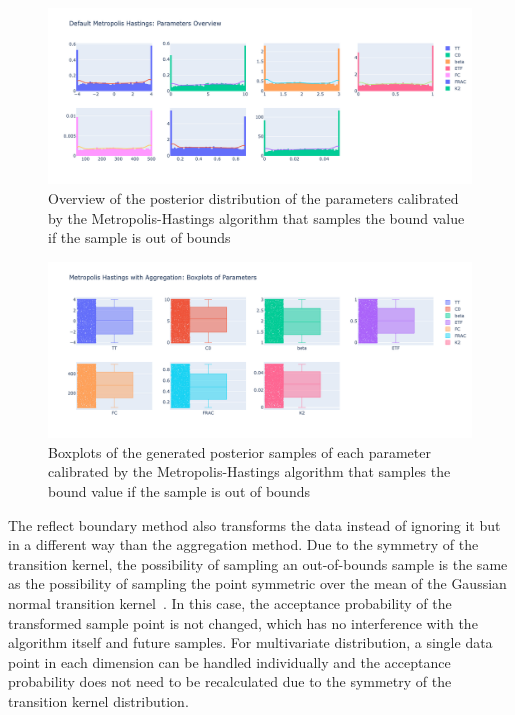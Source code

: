 \begin{figure}[H]
    \centering
    \includegraphics[width=1\textwidth]{figures/basic_mh/aggr_mh/aggr_mh_parameters_overview.png}
    \captionsetup{width=.8\textwidth}
    \caption{Overview of the posterior distribution of the parameters calibrated by the Metropolis-Hastings algorithm that samples the bound value if the sample is out of bounds}
    \label{fig:enter-label}
\end{figure}

\begin{figure}[H]
    \centering
    \includegraphics[width=1\textwidth]{figures/basic_mh/aggr_mh/aggr_mh_boxplot.png}
    \captionsetup{width=.8\textwidth}
    \caption{Boxplots of the generated posterior samples of each parameter
calibrated by the Metropolis-Hastings algorithm that samples the bound value if the sample is out of bounds}
    \label{fig:enter-label}
\end{figure}



The reflect boundary method also transforms the data instead of ignoring it but in a different way than the aggregation method. Due to the symmetry of the transition kernel, the possibility of sampling an out-of-bounds sample is the same as the possibility of sampling the point symmetric over the mean of the Gaussian normal transition kernel~\cite{gaussian_distribution_property}. In this case, the acceptance probability of the transformed sample point is not changed, which has no interference with the algorithm itself and future samples. For multivariate distribution, a single data point in each dimension can be handled individually and the acceptance probability does not need to be recalculated due to the symmetry of the transition kernel distribution. 

